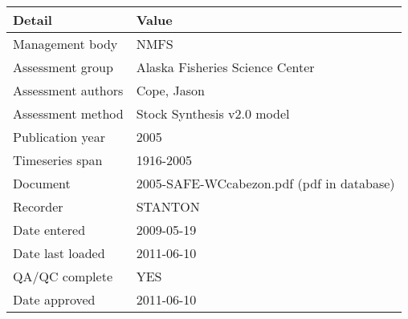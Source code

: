\begin{table}[htb]
\centering
\begin{tabular}{lp{7cm}}
\toprule
Detail & Value \\
\midrule
Management body    & NMFS                                      \\
Assessment group   & Alaska Fisheries Science Center           \\
Assessment authors & Cope, Jason                               \\
Assessment method  & Stock Synthesis v2.0 model                \\
Publication year   & 2005                                      \\
Timeseries span    & 1916-2005                                 \\
Document           & 2005-SAFE-WCcabezon.pdf (pdf in database) \\
Recorder           & STANTON                                   \\
Date entered       & 2009-05-19                                \\
Date last loaded   & 2011-06-10                                \\
QA/QC complete     & YES                                       \\
Date approved      & 2011-06-10                                \\
\bottomrule
\end{tabular}
\label{tab:assessdet}
\end{table}
